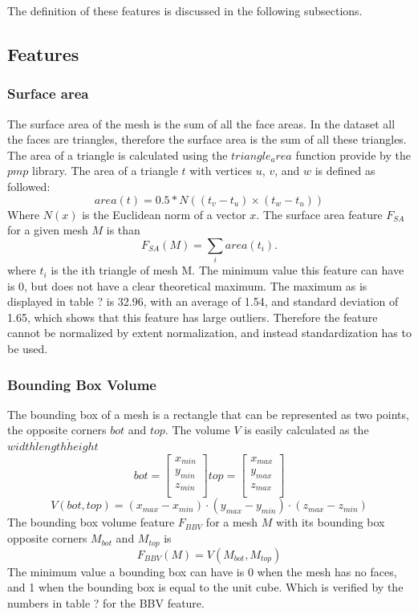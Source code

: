 \documentclass{bigdata}
\begin{document}
The definition of these features is discussed in the following subsections.
\subsection{Features}

\subsubsection{Surface area}
The surface area of the mesh is the sum of all the face areas. In the dataset all the faces are triangles, therefore the surface area is the sum of all these triangles. The area of a triangle is calculated using the $triangle_area$ function provide by the $pmp$ library. The area of a triangle $t$ with vertices $u$, $v$, and $w$ is defined as followed:
\begin{equation}
area(t) = 0.5 * N((t_v-t_u) \times (t_w-t_u))
\end{equation}
Where $N(x)$ is the Euclidean norm of a vector $x$. The surface area feature $F_{SA}$ for a given mesh $M$ is than
\begin{equation}
F_{SA}(M) = \sum\limits_{i} area(t_i).
\end{equation}
where $t_i$ is the ith triangle of mesh M. The minimum value this feature can have is 0, but does not have a clear theoretical maximum. The maximum as is displayed in table ? is 32.96, with an average of 1.54, and standard deviation of 1.65, which shows that this feature has large outliers. Therefore the feature cannot be normalized by extent normalization, and instead standardization has to be used. 

\subsubsection{Bounding Box Volume}
The bounding box of a mesh is a rectangle that can be represented as two points, the opposite corners $bot$ and $top$. The volume $V$ is easily calculated as the $width \dot length \dot height$
\[
bot =
\begin{bmatrix}
x_{min} \\
y_{min} \\
z_{min} \\
\end{bmatrix}
top =
\begin{bmatrix}
x_{max} \\
y_{max} \\
z_{max} \\
\end{bmatrix}
\]
\begin{equation}
V(bot,top) = (x_{max} - x_{min}) \cdot (y_{max}-y_{min}) \cdot (z_{max}-z_{min})
\end{equation}
The bounding box volume feature $F_{BBV}$ for a mesh $M$ with its bounding box opposite corners $M_{bot}$ and $M_{top}$ is
\begin{equation}
F_{BBV}(M) = V(M_{bot},M_{top})
\end{equation}
The minimum value a bounding box can have is 0 when the mesh has no faces, and 1 when the bounding box is equal to the unit cube. Which is verified by the numbers in table ? for the BBV feature. 
\end{document}
